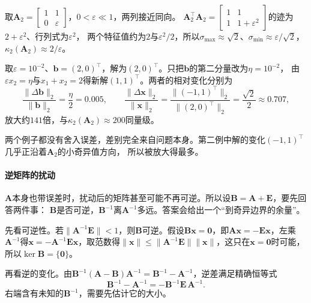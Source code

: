 \begin{example}[近平行列的右端扰动]
\label{ex:ls-rhs-perturbation-near-parallel}
取$\bm A_2=\left[\begin{smallmatrix}1&1\\0&\varepsilon\end{smallmatrix}\right]$，$0<\varepsilon\ll1$，两列接近同向。
$\bm A_2^\top\bm A_2=\left[\begin{smallmatrix}1&1\\1&1+\varepsilon^2\end{smallmatrix}\right]$的迹为$2+\varepsilon^2$、行列式为$\varepsilon^2$，
两个特征值约为$2$与$\varepsilon^2/2$，所以$\sigma_{\max}\approx\sqrt2$、$\sigma_{\min}\approx\varepsilon/\sqrt2$，$\kappa_2(\bm A_2)\approx2/\varepsilon$。

取$\varepsilon=10^{-2}$、$\bm b=(2,0)^\top$，解为$(2,0)^\top$。只把$\bm b$的第二分量改为$\eta=10^{-2}$，
由$\varepsilon x_2=\eta$与$x_1+x_2=2$得新解$(1,1)^\top$。两者的相对变化分别为
\[
 \frac{\lVert\Delta\bm b\rVert_2}{\lVert\bm b\rVert_2}=\frac{\eta}{2}=0.005,\qquad
 \frac{\lVert\Delta\bm x\rVert_2}{\lVert\bm x\rVert_2}=\frac{\lVert(-1,1)^\top\rVert_2}{\lVert(2,0)^\top\rVert_2}=\frac{\sqrt2}{2}\approx0.707,
\]
放大约$141$倍，与$\kappa_2(\bm A_2)\approx200$同量级。
\end{example}

两个例子都没有舍入误差，差别完全来自问题本身。第二例中解的变化$(-1,1)^\top$几乎正沿着$\bm A_2$的小奇异值方向，
所以被放大得最多。

\paragraph{逆矩阵的扰动}
\label{sec:ls-inverse-sensitivity}
\label{sec:ch06-inverse-stability}

$\bm A$本身也带误差时，扰动后的矩阵甚至可能不再可逆。所以设$\bm B=\bm A+\bm E$，要先回答两件事：
$\bm B$是否可逆，$\bm B^{-1}$离$\bm A^{-1}$多远。答案会给出一个“到奇异边界的余量”。

先看可逆性。若$\lVert\bm A^{-1}\bm E\rVert<1$，则$\bm B$可逆。假设$\bm B\bm x=\bm0$，即$\bm A\bm x=-\bm E\bm x$，左乘$\bm A^{-1}$得$\bm x=-\bm A^{-1}\bm E\bm x$，取范数得$\lVert\bm x\rVert\leq\lVert\bm A^{-1}\bm E\rVert\lVert\bm x\rVert$，这只在$\bm x=\bm0$时可能，所以$\ker\bm B=\{\bm0\}$。

再看逆的变化。由$\bm B^{-1}(\bm A-\bm B)\bm A^{-1}=\bm B^{-1}-\bm A^{-1}$，逆差满足精确恒等式
\begin{equation}
 \bm B^{-1}-\bm A^{-1}
 =-\bm B^{-1}\bm E\,\bm A^{-1}.
 \label{eq:ch06-inverse-finite-perturbation}
\end{equation}
右端含有未知的$\bm B^{-1}$，需要先估计它的大小。

